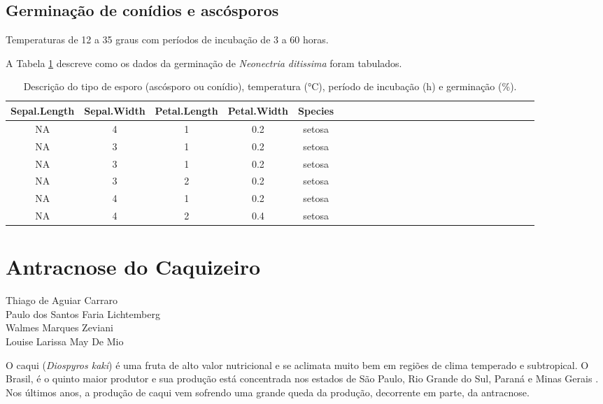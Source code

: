 \documentclass[a4paper,]{book}
\begin{document}
\section{Germinação de conídios e
ascósporos}\label{germinacao-de-conidios-e-ascosporos}

Temperaturas de 12 a 35 graus com períodos de incubação de 3 a 60 horas.

A Tabela \ref{tab:germinacao-neonectria-ditissima} descreve como os
dados da germinação de \emph{Neonectria ditissima} foram tabulados.





\begin{table}[t]

\caption{\label{tab:germinacao-neonectria-ditissima}Descrição do tipo de esporo
(ascósporo ou conídio), temperatura (°C), período de incubação (h) e
germinação (\%).}
\centering
\begin{tabular}{ccccc|ccccc|ccccc|ccccc|ccccc}
\hline
Sepal.Length & Sepal.Width & Petal.Length & Petal.Width & Species\\
\hline
NA & 4 & 1 & 0.2 & setosa\\
\hline
NA & 3 & 1 & 0.2 & setosa\\
\hline
NA & 3 & 1 & 0.2 & setosa\\
\hline
NA & 3 & 2 & 0.2 & setosa\\
\hline
NA & 4 & 1 & 0.2 & setosa\\
\hline
NA & 4 & 2 & 0.4 & setosa\\
\hline
\end{tabular}
\end{table}

\chapter{Antracnose do Caquizeiro}\label{antracnose-do-caquizeiro}

\pagestyle{fancy}

\begin{flushright}
Thiago de Aguiar Carraro\\
Paulo dos Santos Faria Lichtemberg\\
Walmes Marques Zeviani\\
Louise Larissa May De Mio
\end{flushright}

\vspace{2em}

O caqui (\emph{Diospyros kaki}) é uma fruta de alto valor nutricional e
se aclimata muito bem em regiões de clima temperado e subtropical. O
Brasil, é o quinto maior produtor e sua produção está concentrada nos
estados de São Paulo, Rio Grande do Sul, Paraná e Minas Gerais
\citep{fao2017}. Nos últimos anos, a produção de caqui vem sofrendo uma
grande queda da produção, decorrente em parte, da antracnose.
\end{document}
